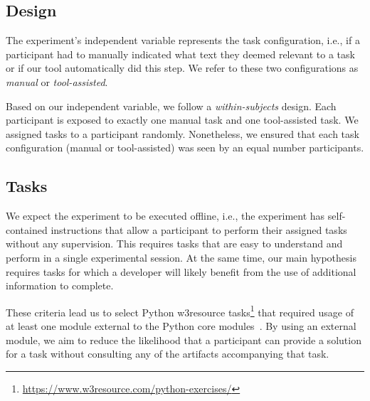 

\subsection{Design}


The experiment's independent variable represents the task configuration, i.e., if a participant had to manually indicated what text they deemed relevant to a task
or if our tool automatically did this step. We refer to these two configurations as \textit{manual} or \textit{tool-assisted}. 


Based on our independent variable, we follow a \textit{within-subjects} design. Each participant is exposed to exactly one manual task and one tool-assisted task.
We assigned tasks to a participant randomly. Nonetheless,  
we ensured that each task configuration (manual or tool-assisted) was seen by an equal number participants.








\subsection{Tasks}
\label{sec:experiment-tasks}



We expect the experiment to be executed offline, i.e., the experiment has self-contained instructions that allow a participant to perform their assigned tasks without any supervision.
This requires tasks that are easy to understand and perform in a single experimental session. At the same time, our main hypothesis requires tasks for which a developer will likely benefit from the use of additional information to complete.


These criteria lead us to select Python w3resource tasks\footnote{\url{https://www.w3resource.com/python-exercises/}}
that required usage of at least one module external to the Python core modules~\cite{thiselton2019}.
By using an external module, we aim to reduce the likelihood that a participant 
can provide a solution for a task without consulting any of the artifacts accompanying that task. 






